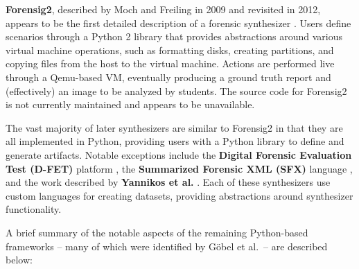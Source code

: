 \textbf{Forensig2}, described by Moch and Freiling in 2009 and revisited
in 2012, appears to be the first detailed description of a forensic
synthesizer
\cite{mochForensicImageGenerator2009,mochEvaluatingForensicImage2012}.
Users define scenarios through a Python 2 library that provides
abstractions around various virtual machine operations, such as
formatting disks, creating partitions, and copying files from the host
to the virtual machine. Actions are performed live through a Qemu-based
VM, eventually producing a ground truth report and (effectively) an
image to be analyzed by students. The source code for Forensig2 is not
currently maintained and appears to be unavailable.

The vast majority of later synthesizers are similar to Forensig2 in that
they are all implemented in Python, providing users with a Python
library to define and generate artifacts. Notable exceptions include the
\textbf{Digital Forensic Evaluation Test (D-FET)} platform
\cite{williamCloudbasedDigitalForensics2011}, the \textbf{Summarized
Forensic XML (SFX)} language
\cite{russellForensicImageDescription2012}, and the work described
by \textbf{Yannikos et al.} \cite{yannikosDataCorporaDigital2014}.
Each of these synthesizers use custom languages for creating datasets,
providing abstractions around synthesizer functionality.

A brief summary of the notable aspects of the remaining Python-based
frameworks -- many of which were identified by Göbel et al.~-- are
described below:

